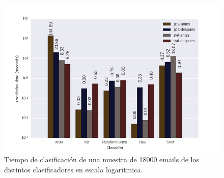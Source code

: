 \begin{figure}[h!]
	\centering
	\includegraphics[width=1\textwidth]{../results/tiempos.png}
	\caption{Tiempo de clasificación de una muestra de 18000 emails de los distintos clasificadores en escala logarítmica.}
	\label{figure:time}
\end{figure}

